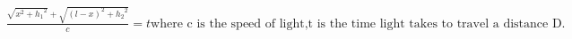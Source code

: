 \documentclass[preview]{standalone}
\begin{document}
\begin{align*}
\frac{\sqrt{x^2 + {h_1}^2} + \sqrt{(l-x)^2 + {h_2}^2}}{c} = t \text{where c is the speed of light,} \text{t is the time light takes to travel a distance D.}
\end{align*}
\end{document}
